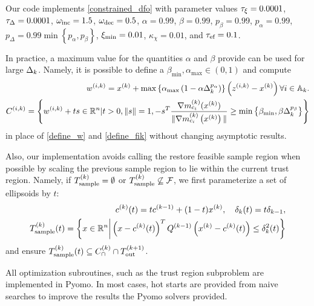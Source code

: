 Our code implements \cref{constrained_dfo} with parameter values
$\tau_{\xi} = 0.0001$, 
$\tau_{\Delta} = 0.0001$, 
$\omega_{\text{inc}} = 1.5$, 
$\omega_{\text{dec}} = 0.5$, 
$\alpha = 0.99$, 
$\beta = 0.99$,
$p_{\beta} = 0.99$,
$p_{\alpha} = 0.99$,
$p_{\Delta} = 0.99\min\left\{p_{\alpha}, p_{\beta}\right\}$,
$\xi_{\text{min}}=0.01$,
$ \kappa_{\chi} = 0.01$,
and ${\tau_{\textrm{ef}}} = 0.1$.


In practice, a maximum value for the quantities $\alpha$ and $\beta$ provide can be used for large $\Delta_k$.
Namely, it is possible to define a $\beta_{\textrm{min}}, \alpha_{\textrm{max}} \in (0, 1)$ and compute
\begin{align*}
{w^{(i, k)}} = x^{(k)} + \max\left\{\alpha_{\textrm{max}}\left(1 - \alpha\Delta_k^{p_{\alpha}}\right)\right\}\left({z^{(i, k)}} - x^{(k)}\right) \forall i \in {\mathbb A_{k}}.  \\
{C^{(i, k)}} = \left\{ {w^{(i, k)}} + t s \in \mathbb R^n | t > 0, \|s\| = 1, -s^T{\frac{\nabla m^{(k)}_{c_i}(x^{(k)})}{\|\nabla m^{(k)}_{c_i}\left(x^{(k)}\right)\|}} \ge \min\left\{\beta_{\textrm{min}}, \beta \Delta_k^{p_{\beta}} \right\} \right\}
\end{align*}
in place of \cref{define_w} and \cref{define_fik} without changing asymptotic results.

Also, our implementation avoids calling the restore feasible sample region when possible by scaling the previous sample region to
lie within the current trust region.
Namely, if ${T_{\text{sample}}^{(k)}} = \emptyset$ or ${T_{\text{sample}}^{(k)}} \not \subseteq {\mathcal F}$, we first parameterize a set of ellipsoids by $t$:
\begin{align*}
c^{(k)}(t) = t {c^{(k-1)}} + (1-t) x^{(k)}, \quad \delta_k(t) = t \delta_{k-1}, \\
{T_{\text{sample}}^{(k)}}(t) = \left\{x \in \mathbb R^n \bigg | \left(x -  c^{(k)}(t)\right)^T {Q^{(k-1)}} \left(x^{(k)} - c^{(k)}(t) \right) \le \delta_k^2(t) \right\}
\end{align*}
and ensure ${T_{\text{sample}}^{(k)}}(t) \subseteq {C^{(k)}_{\cap}} \cap {T_{\text{out}}^{(k+1)}}$.

% 
% 


All optimization subroutines, such as the trust region subproblem are implemented in Pyomo.
In most cases, hot starts are provided from naive searches to improve the results the Pyomo solvers provided.


